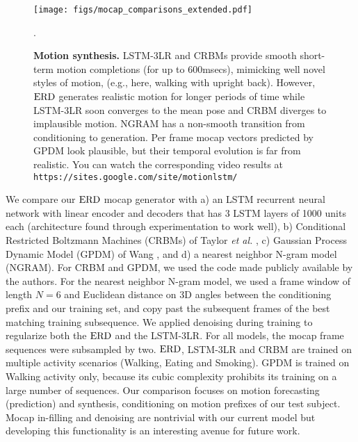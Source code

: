 \documentclass[10pt,twocolumn,letterpaper]{article}
\begin{document}
\begin{figure}[h!]
\begin{center}
\texttt{[image: figs/mocap\_comparisons\_extended.pdf]}
\end{center}
\caption{ \textbf{Motion synthesis.}  
LSTM-3LR and  CRBMs \cite{thr-mhmub-06} provide  smooth short-term motion completions  (for up to 600msecs), mimicking well novel styles of motion, (e.g., here, walking with upright back).  However,  $\text{ERD}$  generates realistic motion for  longer periods of time while LSTM-3LR soon converges to the mean pose and  CRBM  diverges to implausible motion.  NGRAM  has a non-smooth transition from conditioning to generation. Per frame mocap vectors  predicted by GPDM \cite{Wang06gaussianprocess}  look plausible,  but their temporal evolution is far from realistic.  You can watch the corresponding video results  at {\tt https://sites.google.com/site/motionlstm/} }.
\label{fig:crbm}
\end{figure}

We compare our $\text{ERD}$ mocap generator with  a) an LSTM recurrent neural network with linear encoder and decoders that has 3 LSTM layers of 1000 units each (architecture found through experimentation to work well), b) Conditional Restricted Boltzmann Machines (CRBMs) of Taylor \textit{et al.} \cite{thr-mhmub-06}, c)  Gaussian Process Dynamic Model (GPDM) of Wang \ea \cite{Wang06gaussianprocess}, and d) a nearest neighbor N-gram model (NGRAM).   For CRBM and GPDM, we used the code made publicly available by the authors. For the nearest neighbor N-gram model, we used a frame window of length $N=6$ and Euclidean distance on 3D angles between the conditioning prefix and our training set,  and copy past the subsequent frames of the best matching training subsequence.  
We applied denoising during training to regularize both the $\text{ERD}$ and the LSTM-3LR.  For all models, the mocap frame sequences were subsampled by two. $\text{ERD}$, LSTM-3LR and CRBM are trained on multiple activity scenarios (Walking, Eating and Smoking).  GPDM is trained on Walking activity only, because   its  cubic complexity prohibits its training on a large number of  sequences.  
Our comparison focuses  on motion forecasting (prediction) and synthesis, conditioning on motion prefixes of our test subject.  Mocap in-filling and denoising  are nontrivial with our current  model but developing this functionality is an interesting avenue for future work. 
\end{document}
